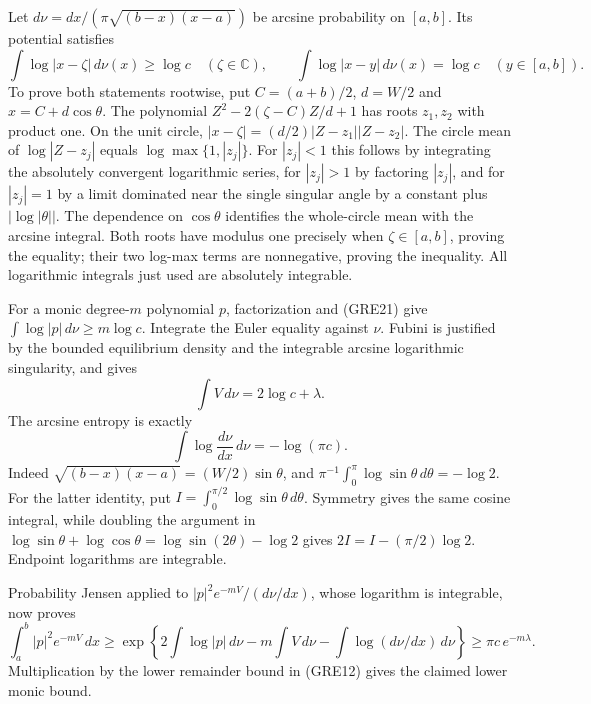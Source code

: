 \documentclass[11pt,a4paper]{article}
\begin{document}
Let $d\nu=dx/(\pi\sqrt{(b-x)(x-a)})$ be arcsine probability
on $[a,b]$. Its potential satisfies
\[
 \int\log|x-\zeta|\,d\nu(x)\ge\log c
   \quad(\zeta\in\mathbb C),\qquad
 \int\log|x-y|\,d\nu(x)=\log c\quad(y\in[a,b]).
 \tag{GRE21}
\]
To prove both statements rootwise, put $C=(a+b)/2$, $d=W/2$ and
$x=C+d\cos\theta$. The polynomial
$Z^2-2(\zeta-C)Z/d+1$ has roots $z_1,z_2$ with product one.
On the unit circle,
$|x-\zeta|=(d/2)|Z-z_1||Z-z_2|$.
The circle mean of $\log|Z-z_j|$ equals
$\log\max\{1,|z_j|\}$. For $|z_j|<1$ this follows by integrating
the absolutely convergent logarithmic series, for $|z_j|>1$ by
factoring $|z_j|$, and for $|z_j|=1$ by a limit dominated near the
single singular angle by a constant plus $|\log|\theta||$.
The dependence on $\cos\theta$ identifies the whole-circle mean
with the arcsine integral. Both roots have modulus one precisely
when $\zeta\in[a,b]$, proving the equality; their two log-max
terms are nonnegative, proving the inequality. All logarithmic
integrals just used are absolutely integrable.

For a monic degree-$m$ polynomial $p$, factorization and (GRE21)
give $\int\log|p|\,d\nu\ge m\log c$. Integrate the Euler equality
against $\nu$. Fubini is justified by the bounded equilibrium
density and the integrable arcsine logarithmic singularity, and gives
\[
 \int V\,d\nu=2\log c+\lambda.
 \tag{GRE22}
\]
The arcsine entropy is exactly
\[
 \int\log\frac{d\nu}{dx}\,d\nu=-\log(\pi c).
 \tag{GRE23}
\]
Indeed $\sqrt{(b-x)(x-a)}=(W/2)\sin\theta$, and
$\pi^{-1}\int_0^\pi\log\sin\theta\,d\theta=-\log2$.
For the latter identity, put $I=\int_0^{\pi/2}\log\sin\theta\,d\theta$.
Symmetry gives the same cosine integral, while doubling the argument
in $\log\sin\theta+\log\cos\theta=\log\sin(2\theta)-\log2$
gives $2I=I-(\pi/2)\log2$. Endpoint logarithms are integrable.

Probability Jensen applied to
$|p|^2e^{-mV}/(d\nu/dx)$, whose logarithm is integrable, now proves
\[
 \int_a^b |p|^2e^{-mV}\,dx
 \ge\exp\left\{2\int\log|p|\,d\nu-m\int V\,d\nu
                    -\int\log(d\nu/dx)\,d\nu\right\}
 \ge\pi c\,e^{-m\lambda}.
 \tag{GRE24}
\]
Multiplication by the lower remainder bound in (GRE12) gives the
claimed lower monic bound.
\end{document}
